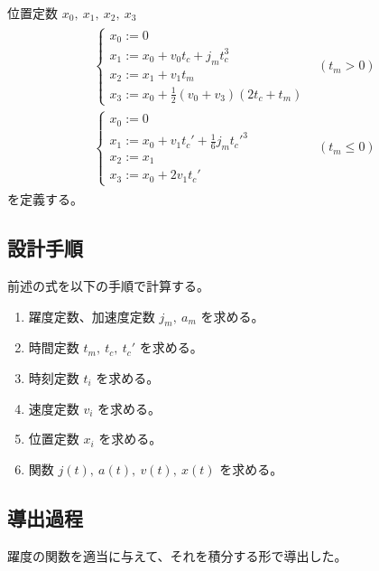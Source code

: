 \documentclass[a5paper]{ltjsarticle}
\begin{document}
位置定数 $x_0,~x_1,~x_2,~x_3$
\begin{align}
    \begin{array}{ll}
        \left\{ \begin{array}{l}
            x_0 := 0                         \\
            x_1 := x_0 + v_0 t_c + j_m t_c^3 \\
            x_2 := x_1 + v_1 t_m             \\
            x_3 := x_0 + \frac{1}{2} (v_0+v_3) (2t_c+t_m)
        \end{array} \right.
         &
        (t_m > 0)
        \\
        \left\{ \begin{array}{l}
            x_0 := 0                                       \\
            x_1 := x_0 + v_1 t_c' + \frac{1}{6} j_m t_c'^3 \\
            x_2 := x_1                                     \\
            x_3 := x_0 + 2 v_1 t_c'
        \end{array} \right.
         &
        (t_m \leq 0)
    \end{array}
\end{align}
を定義する。

\subsection{設計手順}
前述の式を以下の手順で計算する。
\begin{enumerate}
    \item 躍度定数、加速度定数 $j_m,~a_m$ を求める。
    \item 時間定数 $t_m,~t_c,~t_c'$ を求める。
    \item 時刻定数 $t_i$ を求める。
    \item 速度定数 $v_i$ を求める。
    \item 位置定数 $x_i$ を求める。
    \item 関数 $j(t),~ a(t),~ v(t),~ x(t)$ を求める。
\end{enumerate}

\subsection{導出過程}
躍度の関数を適当に与えて、それを積分する形で導出した。
\end{document}
